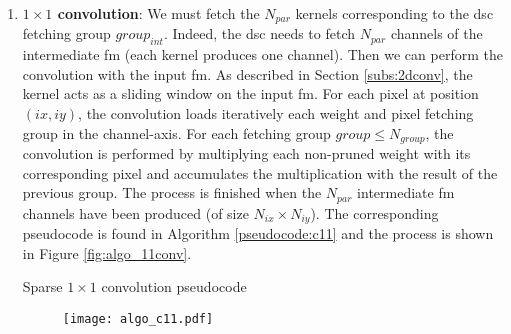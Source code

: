 \begin{enumerate}
    \item \textbf{$1 \times 1$ convolution}: We must fetch the $N_{par}$ kernels corresponding to the \acrshort{dsc} fetching group $group_{int}$. Indeed, the \acrshort{dsc} needs to fetch $N_{par}$ channels of the intermediate \acrshort{fm} (each kernel produces one channel). Then we can perform the convolution with the input \acrshort{fm}. As described in Section \ref{subs:2dconv}, the kernel acts as a sliding window on the input \acrshort{fm}. For each pixel at position $(ix, iy)$, the convolution loads iteratively each weight and pixel fetching group in the channel-axis. For each fetching group $group \leq N_{group}$, the convolution is performed by multiplying each non-pruned weight with its corresponding pixel and accumulates the multiplication with the result of the previous group. The process is finished when the $N_{par}$ intermediate \acrshort{fm} channels have been produced (of size $N_{ix} \times N_{iy}$). The corresponding pseudocode is found in Algorithm \ref{pseudocode:c11} and the process is shown in Figure \ref{fig:algo_11conv}.
    \begin{algorithm}[H]
        \centering
        \begin{algorithmic}
             
                 
                     
                         
                             
                            \EndFor
                        \EndFor
                    \EndFor
                \EndFor
            \EndFor
        \end{algorithmic}
        \caption{Sparse $1 \times 1$ convolution pseudocode}
        \label{pseudocode:c11}
    \end{algorithm}
    \begin{figure}[H]
        \centering
        \texttt{[image: algo\_c11.pdf]}

\end{figure}
\end{enumerate}
